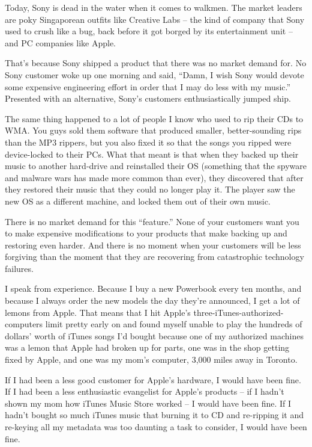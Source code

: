 Today, Sony is dead in the water when it comes to walkmen. The
market leaders are poky Singaporean outfits like Creative Labs --
the kind of company that Sony used to crush like a bug, back before
it got borged by its entertainment unit -- and PC companies like
Apple.

That's because Sony shipped a product that there was no market
demand for. No Sony customer woke up one morning and said, ``Damn, I
wish Sony would devote some expensive engineering effort in order
that I may do less with my music.'' Presented with an alternative,
Sony's customers enthusiastically jumped ship.

The same thing happened to a lot of people I know who used to rip
their CDs to WMA. You guys sold them software that produced
smaller, better-sounding rips than the MP3 rippers, but you also
fixed it so that the songs you ripped were device-locked to their
PCs. What that meant is that when they backed up their music to
another hard-drive and reinstalled their OS (something that the
spyware and malware wars has made more common than ever), they
discovered that after they restored their music that they could no
longer play it. The player saw the new OS as a different machine,
and locked them out of their own music.

There is no market demand for this ``feature.'' None of your
customers want you to make expensive modifications to your products
that make backing up and restoring even harder. And there is no
moment when your customers will be less forgiving than the moment
that they are recovering from catastrophic technology failures.

I speak from experience. Because I buy a new Powerbook every ten
months, and because I always order the new models the day they're
announced, I get a lot of lemons from Apple. That means that I hit
Apple's three-iTunes-authorized-computers limit pretty early on and
found myself unable to play the hundreds of dollars' worth of
iTunes songs I'd bought because one of my authorized machines was a
lemon that Apple had broken up for parts, one was in the shop
getting fixed by Apple, and one was my mom's computer, 3,000 miles
away in Toronto.

If I had been a less good customer for Apple's hardware, I would
have been fine. If I had been a less enthusiastic evangelist for
Apple's products -- if I hadn't shown my mom how iTunes Music Store
worked -- I would have been fine. If I hadn't bought so much iTunes
music that burning it to CD and re-ripping it and re-keying all my
metadata was too daunting a task to consider, I would have been
fine.


